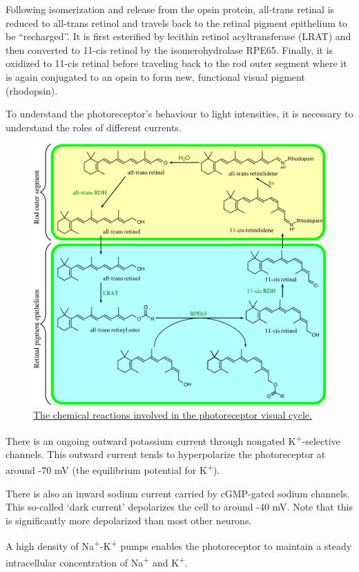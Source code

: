 Following isomerization and release from the opsin protein, all-trans retinal is reduced to all-trans retinol and travels back to the retinal pigment epithelium to be ``recharged''. It is first esterified by lecithin retinol acyltransferase (LRAT) and then converted to 11-cis retinol by the isomerohydrolase RPE65. Finally, it is oxidized to 11-cis retinal before traveling back to the rod outer segment where it is again conjugated to an opsin to form new, functional visual pigment (rhodopsin).

To understand the photoreceptor's behaviour to light intensities, it is necessary to understand the roles of different currents.



\begin{figure}

{\centering \includegraphics[width=0.7\linewidth]{./figures/visual/Visual_cycle} 

}

\caption{\href{https://commons.wikimedia.org/wiki/File:Visual_cycle.svg}{The chemical reactions involved in the photoreceptor visual cycle.}}\label{fig:absorption}
\end{figure}

There is an ongoing outward potassium current through nongated K\textsuperscript{+}-selective channels. This outward current tends to hyperpolarize the photoreceptor at around -70 mV (the equilibrium potential for K\textsuperscript{+}).

There is also an inward sodium current carried by cGMP-gated sodium channels. This so-called `dark current' depolarizes the cell to around -40 mV. Note that this is significantly more depolarized than most other neurons.

A high density of Na\textsuperscript{+}-K\textsuperscript{+} pumps enables the photoreceptor to maintain a steady intracellular concentration of Na\textsuperscript{+} and K\textsuperscript{+}.

